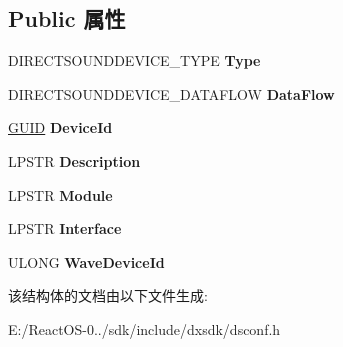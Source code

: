 \subsection*{Public 属性}
\begin{DoxyCompactItemize}
\item 
\mbox{\label{struct___d_s_p_r_o_p_e_r_t_y___d_i_r_e_c_t_s_o_u_n_d_d_e_v_i_c_e___d_e_s_c_r_i_p_t_i_o_n___a___d_a_t_a_a6ffdeb5260a595b59fd045e841d7c433}} 
D\+I\+R\+E\+C\+T\+S\+O\+U\+N\+D\+D\+E\+V\+I\+C\+E\+\_\+\+T\+Y\+PE {\bfseries Type}
\item 
\mbox{\label{struct___d_s_p_r_o_p_e_r_t_y___d_i_r_e_c_t_s_o_u_n_d_d_e_v_i_c_e___d_e_s_c_r_i_p_t_i_o_n___a___d_a_t_a_a15c853bb25298b681ce4b73bf742e275}} 
D\+I\+R\+E\+C\+T\+S\+O\+U\+N\+D\+D\+E\+V\+I\+C\+E\+\_\+\+D\+A\+T\+A\+F\+L\+OW {\bfseries Data\+Flow}
\item 
\mbox{\label{struct___d_s_p_r_o_p_e_r_t_y___d_i_r_e_c_t_s_o_u_n_d_d_e_v_i_c_e___d_e_s_c_r_i_p_t_i_o_n___a___d_a_t_a_af997ab7ed460f2c14e1fee6a0611b5c3}} 
\hyperlink{interface_g_u_i_d}{G\+U\+ID} {\bfseries Device\+Id}
\item 
\mbox{\label{struct___d_s_p_r_o_p_e_r_t_y___d_i_r_e_c_t_s_o_u_n_d_d_e_v_i_c_e___d_e_s_c_r_i_p_t_i_o_n___a___d_a_t_a_afdea9b245d954c0c6f3cbb4a07d923aa}} 
L\+P\+S\+TR {\bfseries Description}
\item 
\mbox{\label{struct___d_s_p_r_o_p_e_r_t_y___d_i_r_e_c_t_s_o_u_n_d_d_e_v_i_c_e___d_e_s_c_r_i_p_t_i_o_n___a___d_a_t_a_a74ce5892ee49cb0b28418ce2f8e500b0}} 
L\+P\+S\+TR {\bfseries Module}
\item 
\mbox{\label{struct___d_s_p_r_o_p_e_r_t_y___d_i_r_e_c_t_s_o_u_n_d_d_e_v_i_c_e___d_e_s_c_r_i_p_t_i_o_n___a___d_a_t_a_aa625faae1458a455bbf72f7b9bcd03f0}} 
L\+P\+S\+TR {\bfseries Interface}
\item 
\mbox{\label{struct___d_s_p_r_o_p_e_r_t_y___d_i_r_e_c_t_s_o_u_n_d_d_e_v_i_c_e___d_e_s_c_r_i_p_t_i_o_n___a___d_a_t_a_a8a90e4062985e2dd0584adbec1e6f27a}} 
U\+L\+O\+NG {\bfseries Wave\+Device\+Id}
\end{DoxyCompactItemize}


该结构体的文档由以下文件生成\+:\begin{DoxyCompactItemize}
\item 
E\+:/\+React\+O\+S-\/0../sdk/include/dxsdk/dsconf.\+h\end{DoxyCompactItemize}
